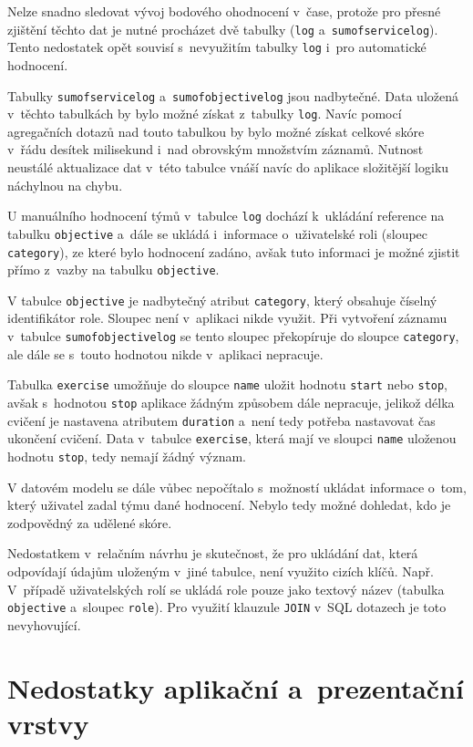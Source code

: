 \documentclass[
  digital,
  twoside,
  table, 
  nolof, 
  nolot
]{fithesis3}
\begin{document}
Nelze snadno sledovat vývoj bodového ohodnocení v~čase, protože pro přesné zjištění těchto dat je nutné procházet dvě tabulky (\texttt{log} a~\texttt{sumofservicelog}). Tento nedostatek opět souvisí s~nevyužitím tabulky \texttt{log} i~pro automatické hodnocení.

Tabulky \texttt{sumofservicelog} a~\texttt{sumofobjectivelog} jsou nadbytečné. Data uložená v~těchto tabulkách by bylo možné získat z~tabulky \texttt{log}. Navíc pomocí agregačních dotazů nad touto tabulkou by bylo možné získat celkové skóre v~řádu desítek milisekund i~nad obrovským množstvím záznamů. Nutnost neustálé aktualizace dat v~této tabulce vnáší navíc do aplikace složitější logiku náchylnou na chybu. 

U manuálního hodnocení týmů v~tabulce \texttt{log} dochází k~ukládání reference na tabulku \texttt{objective} a~dále se ukládá i~informace o~uživatelské roli (sloupec \texttt{category}), ze které bylo hodnocení zadáno, avšak tuto informaci je možné zjistit přímo z~vazby na tabulku \texttt{objective}.

V tabulce \texttt{objective} je nadbytečný atribut \texttt{category}, který obsahuje číselný identifikátor role. Sloupec není v~aplikaci nikde využit. Při vytvoření záznamu v~tabulce \texttt{sumofobjectivelog} se tento sloupec překopíruje do sloupce \texttt{category}, ale dále se s~touto hodnotou nikde v~aplikaci nepracuje.

Tabulka \texttt{exercise} umožňuje do sloupce \texttt{name} uložit hodnotu \texttt{start} nebo \texttt{stop}, avšak s~hodnotou \texttt{stop} aplikace žádným způsobem dále nepracuje, jelikož délka cvičení je nastavena atributem \texttt{duration} a~není tedy potřeba nastavovat čas ukončení cvičení. Data v~tabulce \texttt{exercise}, která mají ve sloupci \texttt{name} uloženou hodnotu \texttt{stop}, tedy nemají žádný význam.

V datovém modelu se dále vůbec nepočítalo s~možností ukládat informace o~tom, který uživatel zadal týmu dané hodnocení. Nebylo tedy možné dohledat, kdo je zodpovědný za udělené skóre.

Nedostatkem v~relačním návrhu je skutečnost, že pro ukládání dat, která odpovídají údajům uloženým v~jiné tabulce, není využito cizích klíčů. Např. V~případě uživatelských rolí se ukládá role pouze jako textový název (tabulka \texttt{objective} a~sloupec \texttt{role}). Pro využití klauzule \texttt{JOIN} v~SQL dotazech je toto nevyhovující.

\section{Nedostatky aplikační a~prezentační vrstvy}
\end{document}
